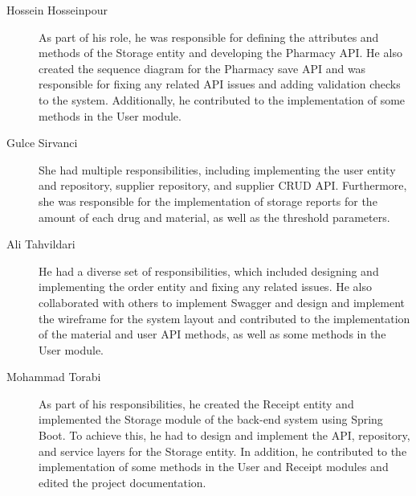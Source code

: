\begin{description}
	\item[Hossein Hosseinpour] As part of his role, he was responsible for defining the attributes and methods of the Storage entity and developing the Pharmacy API. He also created the sequence diagram for the Pharmacy save API and was responsible for fixing any related API issues and adding validation checks to the system. Additionally, he contributed to the implementation of some methods in the User module.

   \item[Gulce Sirvanci] She had multiple responsibilities, including implementing the user entity and repository, supplier repository, and supplier CRUD API. Furthermore, she was responsible for the implementation of storage reports for the amount of each drug and material, as well as the threshold parameters.

   \item[Ali Tahvildari] He had a diverse set of responsibilities, which included designing and implementing the order entity and fixing any related issues. He also collaborated with others to implement Swagger and design and implement the wireframe for the system layout and contributed to the implementation of the material and user API methods, as well as some methods in the User module.

   \item[Mohammad Torabi] As part of his responsibilities, he created the Receipt entity and implemented the Storage module of the back-end system using Spring Boot. To achieve this, he had to design and implement the API, repository, and service layers for the Storage entity. In addition, he contributed to the implementation of some methods in the User and Receipt modules and edited the project documentation.

\end{description}
